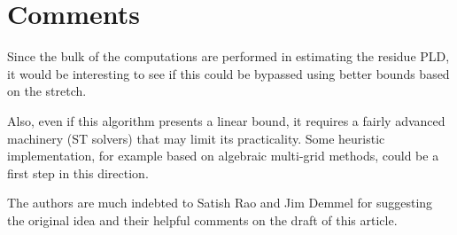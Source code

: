 
\section*{Comments}

Since the bulk of the computations are performed in estimating the
residue PLD, it would be interesting to see if this could be bypassed
using better bounds based on the stretch.

Also, even if this algorithm presents a linear bound, it requires
a fairly advanced machinery (ST solvers) that may limit its practicality.
Some heuristic implementation, for example based on algebraic multi-grid
methods, could be a first step in this direction.

The authors are much indebted to Satish Rao and Jim Demmel for suggesting
the original idea and their helpful comments on the draft of this
article.
